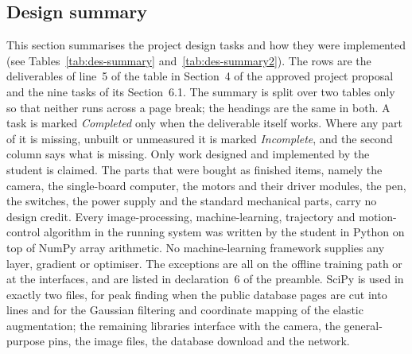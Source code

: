 \providecommand{\wht}{h_{\mathrm{t}}}

\subsection{Design summary}
\label{sec:summary}

This section summarises the project design tasks and how they were implemented (see Tables~\ref{tab:des-summary} and~\ref{tab:des-summary2}).
The rows are the deliverables of line~5 of the table in Section~4 of the approved project proposal and the nine tasks of its Section~6.1.
The summary is split over two tables only so that neither runs across a page break; the headings are the same in both.
A task is marked \emph{Completed} only when the deliverable itself works. Where any part of it is missing, unbuilt or unmeasured it is marked \emph{Incomplete}, and the second column says what is missing.
Only work designed and implemented by the student is claimed. The parts that were bought as finished items, namely the camera, the single-board computer, the motors and their driver modules, the pen, the switches, the power supply and the standard mechanical parts, carry no design credit.
Every image-processing, machine-learning, trajectory and motion-control algorithm in the running system was written by the student in Python on top of NumPy array arithmetic. No machine-learning framework supplies any layer, gradient or optimiser. The exceptions are all on the offline training path or at the interfaces, and are listed in declaration~6 of the preamble. SciPy is used in exactly two files, for peak finding when the public database pages are cut into lines and for the Gaussian filtering and coordinate mapping of the elastic augmentation; the remaining libraries interface with the camera, the general-purpose pins, the image files, the database download and the network.


